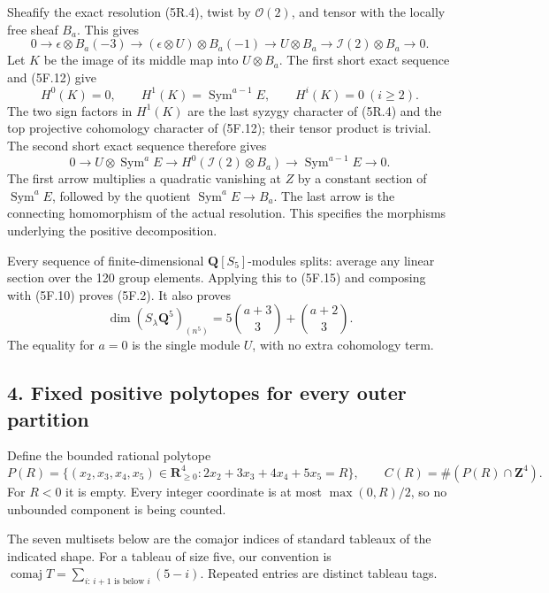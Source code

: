\documentclass[
  10pt,
]{article}
\begin{document}
Sheafify the exact resolution (5R.4), twist by \(\mathcal O(2)\), and
tensor with the locally free sheaf \(B_a\). This gives \[
0\longrightarrow\epsilon\otimes B_a(-3)
\longrightarrow(\epsilon\otimes U)\otimes B_a(-1)
\longrightarrow U\otimes B_a
\longrightarrow\mathcal I(2)\otimes B_a\longrightarrow0.
\tag{5F.13}
\] Let \(K\) be the image of its middle map into \(U\otimes B_a\). The
first short exact sequence and (5F.12) give \[
H^0(K)=0,\qquad
H^1(K)=\operatorname{Sym}^{a-1}E,
\qquad H^i(K)=0\ (i\ge2).
\tag{5F.14}
\] The two sign factors in \(H^1(K)\) are the last syzygy character of
(5R.4) and the top projective cohomology character of (5F.12); their
tensor product is trivial. The second short exact sequence therefore
gives \[
\boxed{
0\longrightarrow U\otimes\operatorname{Sym}^a E
\longrightarrow H^0(\mathcal I(2)\otimes B_a)
\longrightarrow\operatorname{Sym}^{a-1}E
\longrightarrow0.}
\tag{5F.15}
\] The first arrow multiplies a quadratic vanishing at \(Z\) by a
constant section of \(\operatorname{Sym}^aE\), followed by the quotient
\(\operatorname{Sym}^aE\to B_a\). The last arrow is the connecting
homomorphism of the actual resolution. This specifies the morphisms
underlying the positive decomposition.

Every sequence of finite-dimensional \(\mathbf Q[S_5]\)-modules splits:
average any linear section over the 120 group elements. Applying this to
(5F.15) and composing with (5F.10) proves (5F.2). It also proves \[
\dim(S_\lambda\mathbf Q^5)_{(n^5)}
=5\binom{a+3}{3}+\binom{a+2}{3}.
\tag{5F.16}
\] The equality for \(a=0\) is the single module \(U\), with no extra
cohomology term.

\subsection{4. Fixed positive polytopes for every outer
partition}\label{fixed-positive-polytopes-for-every-outer-partition}

Define the bounded rational polytope \[
P(R)=\{(x_2,x_3,x_4,x_5)\in\mathbf R_{\ge0}^4:
2x_2+3x_3+4x_4+5x_5=R\},
\qquad C(R)=\#(P(R)\cap\mathbf Z^4).
\tag{5F.17}
\] For \(R<0\) it is empty. Every integer coordinate is at most
\(\max(0,R)/2\), so no unbounded component is being counted.

The seven multisets below are the comajor indices of standard tableaux
of the indicated shape. For a tableau of size five, our convention is
\(\operatorname{comaj}T=\sum_{i:\,i+1\text{ is below }i}(5-i)\).
Repeated entries are distinct tableau tags.
\end{document}
